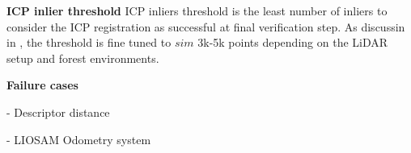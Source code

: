   
\textbf{ICP inlier threshold} \hspace{0.5em} ICP inliers threshold is the least number of inliers to consider the ICP registration as successful at final verification step. As discussin in , the threshold is fine tuned to $sim$ 3k-5k points depending on the LiDAR setup and forest environments. 

  
\textbf{Failure cases}


- Descriptor distance 


- LIOSAM Odometry system 


